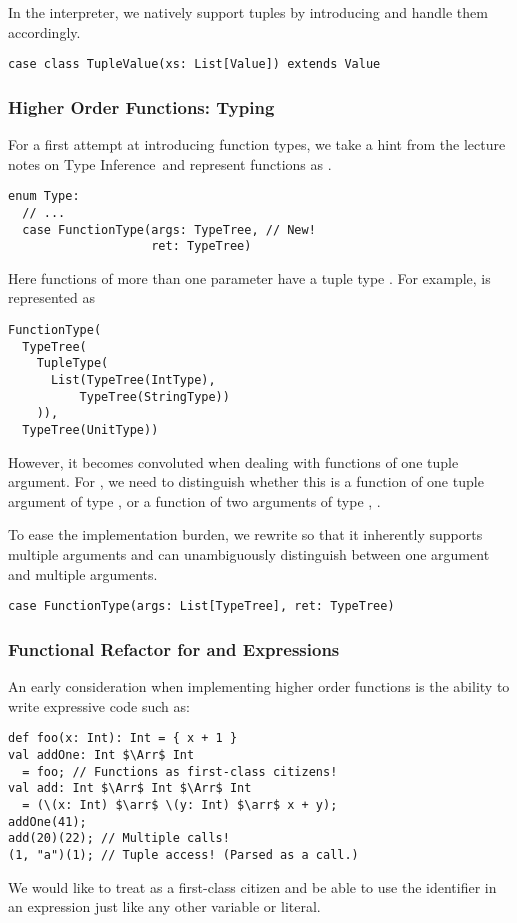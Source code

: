 In the interpreter, we natively support tuples by introducing  and handle them accordingly.
\begin{lstlisting}
case class TupleValue(xs: List[Value]) extends Value
\end{lstlisting}


\subsubsection{Higher Order Functions: Typing}
For a first attempt at introducing function types, we take a hint from the lecture notes on Type Inference\footnotemark\  and represent functions as .
\begin{lstlisting}
enum Type:
  // ...
  case FunctionType(args: TypeTree, // New!
                    ret: TypeTree)
\end{lstlisting}
Here functions of more than one parameter have a tuple type . For example,  is represented as
\begin{lstlisting}
FunctionType(
  TypeTree(
    TupleType(
      List(TypeTree(IntType),
          TypeTree(StringType))
    )),
  TypeTree(UnitType))
\end{lstlisting}
However, it becomes convoluted when dealing with functions of one tuple argument. For , we need to distinguish whether this is a function of one tuple argument of type , or a function of two arguments of type , .

To ease the implementation burden, we rewrite  so that it inherently supports multiple arguments and can unambiguously distinguish between one argument and multiple arguments.
\begin{lstlisting}
case FunctionType(args: List[TypeTree], ret: TypeTree)
\end{lstlisting}


\subsubsection{Functional Refactor for  and  Expressions}\label{sec:call-refactor}
An early consideration when implementing higher order functions is the ability to write expressive code such as:
\begin{lstlisting}
def foo(x: Int): Int = { x + 1 }
val addOne: Int $\Arr$ Int
  = foo; // Functions as first-class citizens!
val add: Int $\Arr$ Int $\Arr$ Int
  = (\(x: Int) $\arr$ \(y: Int) $\arr$ x + y);
addOne(41);
add(20)(22); // Multiple calls!
(1, "a")(1); // Tuple access! (Parsed as a call.)
\end{lstlisting}
We would like to treat  as a first-class citizen and be able to use the identifier in an expression just like any other variable or literal.


